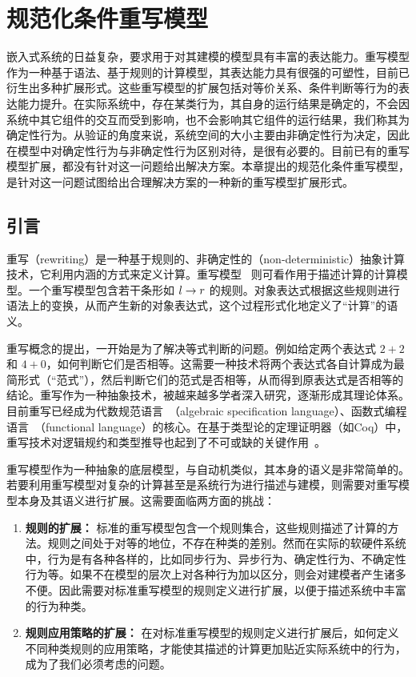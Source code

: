 \chapter{规范化条件重写模型}
\label{cha:normalrewriting}

嵌入式系统的日益复杂，要求用于对其建模的模型具有丰富的表达能力。重写模型作为一种基于语法、基于规则的计算模型，其表达能力具有很强的可塑性，目前已衍生出多种扩展形式。这些重写模型的扩展包括对等价关系、条件判断等行为的表达能力提升。在实际系统中，存在某类行为，其自身的运行结果是确定的，不会因系统中其它组件的交互而受到影响，也不会影响其它组件的运行结果，我们称其为确定性行为。从验证的角度来说，系统空间的大小主要由非确定性行为决定，因此在模型中对确定性行为与非确定性行为区别对待，是很有必要的。目前已有的重写模型扩展，都没有针对这一问题给出解决方案。本章提出的规范化条件重写模型，是针对这一问题试图给出合理解决方案的一种新的重写模型扩展形式。

\section{引言}

重写（rewriting）是一种基于规则的、非确定性的（non-deterministic）抽象计算技术，它利用内涵的方式来定义计算。重写模型~\cite{DBLP:books/el/leeuwen90/DershowitzJ90,terese} 则可看作用于描述计算的计算模型。一个重写模型包含若干条形如 $l\rightarrow r$ 的规则。对象表达式根据这些规则进行语法上的变换，从而产生新的对象表达式，这个过程形式化地定义了“计算”的语义。

重写概念的提出，一开始是为了解决等式判断的问题。例如给定两个表达式 $2+2$ 和 $4+0$，如何判断它们是否相等。这需要一种技术将两个表达式各自计算成为最简形式（“范式”），然后判断它们的范式是否相等，从而得到原表达式是否相等的结论。重写作为一种抽象技术，被越来越多学者深入研究，逐渐形成其理论体系。目前重写已经成为代数规范语言~\cite{DBLP:conf/lics/JouannaudO91}（algebraic specification language）、函数式编程语言~\cite{DBLP:journals/cj/Hughes89}（functional language）的核心。在基于类型论的定理证明器（如Coq）中，重写技术对逻辑规约和类型推导也起到了不可或缺的关键作用~\cite{assaf16a}。

重写模型作为一种抽象的底层模型，与自动机类似，其本身的语义是非常简单的。若要利用重写模型对复杂的计算甚至是系统行为进行描述与建模，则需要对重写模型本身及其语义进行扩展。这需要面临两方面的挑战：
\begin{enumerate}
\item \textbf{规则的扩展：} 标准的重写模型包含一个规则集合，这些规则描述了计算的方法。规则之间处于对等的地位，不存在种类的差别。然而在实际的软硬件系统中，行为是有各种各样的，比如同步行为、异步行为、确定性行为、不确定性行为等。如果不在模型的层次上对各种行为加以区分，则会对建模者产生诸多不便。因此需要对标准重写模型的规则定义进行扩展，以便于描述系统中丰富的行为种类。
\item \textbf{规则应用策略的扩展：} 在对标准重写模型的规则定义进行扩展后，如何定义不同种类规则的应用策略，才能使其描述的计算更加贴近实际系统中的行为，成为了我们必须考虑的问题。
\end{enumerate}

